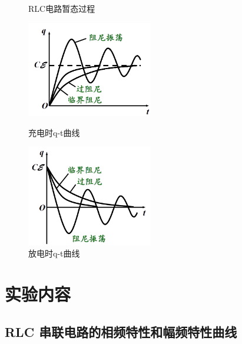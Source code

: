 \documentclass[UTF8]{article}
\begin{document}
\begin{enumerate}
\begin{figure}[H]
\begin{minipage}[t]{0.33\linewidth}
            \caption{RLC电路暂态过程}
        \end{minipage}
        \begin{minipage}[t]{0.33\linewidth}
            \centering
            \includegraphics[width=5.5cm]{Fig/6-充电.png}
            \caption{充电时q-t曲线}
        \end{minipage}
        \begin{minipage}[t]{0.33\linewidth}
            \centering
            \includegraphics[width=5.5cm]{Fig/6-放电.png}
            \caption{放电时q-t曲线}
        \end{minipage}
    \end{figure}
\end{enumerate}


\section{实验内容}
    
\subsection {RLC 串联电路的相频特性和幅频特性曲线}
\end{document}

